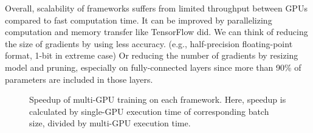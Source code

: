 Overall, scalability of frameworks suffers from limited throughput between GPUs compared to fast computation time.
It can be improved by parallelizing computation and memory transfer like TensorFlow did.
We can think of reducing the size of gradients by using less accuracy. (e.g., half-precision floating-point format, 1-bit in extreme case\cite{1-bit-stochastic-gradient-descent-and-application-to-data-parallel-distributed-training-of-speech-dnns})
Or reducing the number of gradients by resizing model and pruning, especially on fully-connected layers since more than 90\% of parameters are included in those layers.

\begin{figure}[]
  \centering
  \hfil
  \caption{
Speedup of multi-GPU training on each framework.
Here, speedup is calculated by single-GPU execution time of corresponding batch size, divided by multi-GPU execution time.
}
  \label{fig_mg}
\end{figure}

